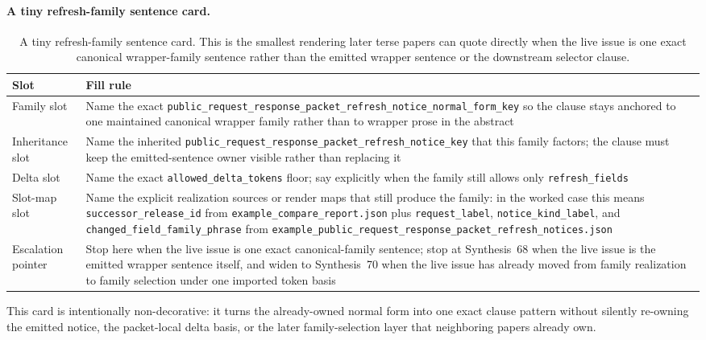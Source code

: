\documentclass[11pt]{article}
\begin{document}
\paragraph{A tiny refresh-family sentence card.}
\begin{table}[t]
\centering
\small
\begin{tabularx}{\linewidth}{@{}lX@{}}
\toprule
Slot & Fill rule \\ 
\midrule
Family slot & Name the exact \nolinkurl{public_request_response_packet_refresh_notice_normal_form_key} so the clause stays anchored to one maintained canonical wrapper family rather than to wrapper prose in the abstract \\ 
Inheritance slot & Name the inherited \nolinkurl{public_request_response_packet_refresh_notice_key} that this family factors; the clause must keep the emitted-sentence owner visible rather than replacing it \\ 
Delta slot & Name the exact \nolinkurl{allowed_delta_tokens} floor; say explicitly when the family still allows only \nolinkurl{refresh_fields} \\ 
Slot-map slot & Name the explicit realization sources or render maps that still produce the family: in the worked case this means \nolinkurl{successor_release_id} from \nolinkurl{example_compare_report.json} plus \nolinkurl{request_label}, \nolinkurl{notice_kind_label}, and \nolinkurl{changed_field_family_phrase} from \nolinkurl{example_public_request_response_packet_refresh_notices.json} \\ 
Escalation pointer & Stop here when the live issue is one exact canonical-family sentence; stop at Synthesis~68 when the live issue is the emitted wrapper sentence itself, and widen to Synthesis~70 when the live issue has already moved from family realization to family selection under one imported token basis \\ 
\bottomrule
\end{tabularx}
\caption{A tiny refresh-family sentence card. This is the smallest rendering later terse papers can quote directly when the live issue is one exact canonical wrapper-family sentence rather than the emitted wrapper sentence or the downstream selector clause.}
\label{tab:refresh-family-sentence-card}
\end{table}

This card is intentionally non-decorative: it turns the already-owned normal form into one exact clause pattern without silently re-owning the emitted notice, the packet-local delta basis, or the later family-selection layer that neighboring papers already own.\cite{series:workedexample}
\end{document}
